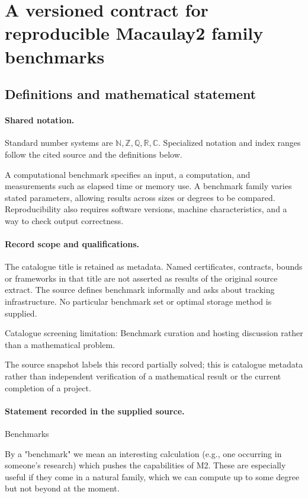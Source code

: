 \documentclass[11pt]{article}
\begin{document}
\section{A versioned contract for reproducible Macaulay2 family benchmarks}\label{statement}

\subsection{Definitions and mathematical statement}

\paragraph{Shared notation.}Standard number systems are $\mathbb N,\mathbb Z,\mathbb Q,\mathbb R,\mathbb C$. Specialized notation and index ranges follow the cited source and the definitions below.


A computational benchmark specifies an input, a computation, and measurements such as elapsed time or memory use. A benchmark family varies stated parameters, allowing results across sizes or degrees to be compared. Reproducibility also requires software versions, machine characteristics, and a way to check output correctness.
\paragraph{Record scope and qualifications.}
The catalogue title is retained as metadata. Named certificates, contracts, bounds or frameworks in that title are not asserted as results of the original source extract.
The source defines benchmark informally and asks about tracking infrastructure. No particular benchmark set or optimal storage method is supplied.

Catalogue screening limitation: Benchmark curation and hosting discussion rather than a mathematical problem.

The source snapshot labels this record partially solved; this is catalogue metadata rather than independent verification of a mathematical result or the current completion of a project.
\paragraph{Statement recorded in the supplied source.}
Benchmarks

By a "benchmark" we mean an interesting calculation (e.g., one occurring in someone's research) which pushes the capabilities of M2. These are especially useful if they come in a natural family, which we can compute up to some degree but not beyond at the moment.
\end{document}
